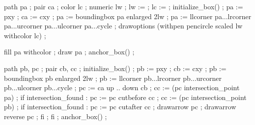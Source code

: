 

  path pa ; pair ca ; color lc ; numeric lw ; 
  lw :=  ;
  lc :=  ; 
  initialize_box() ;
  pa := pxy ; ca := cxy ; pa := boundingbox pa enlarged 2lw ; 
  pa := llcorner pa...lrcorner pa...urcorner pa...ulcorner pa...cycle ;
  drawoptions (withpen pencircle scaled lw withcolor lc) ;
\stopuseMPgraphic

  fill pa withcolor  ; draw pa ; 
  anchor_box() ;
\stopMPpositiongraphic

  path pb, pc ; pair cb, cc ;
  initialize_box() ; 
  pb := pxy ; cb := cxy ; pb := boundingbox pb enlarged 2lw ; 
  pb := llcorner pb...lrcorner pb...urcorner pb...ulcorner pb...cycle ;
  pc := ca {up} .. {down} cb ;
  cc := (pc intersection_point pa) ;
  if intersection_found : 
    pc := pc cutbefore cc ;
    cc := (pc intersection_point pb) ;
    if intersection_found : 
      pc := pc cutafter cc ;
      drawarrow pc ; drawarrow reverse pc ;
    fi ; 
  fi ; 
  anchor_box() ;
\stopMPpositiongraphic



\def\stackposdistance{.5em}

\newcounter\currentautopos

\def\POSstackprefix{stack:}

